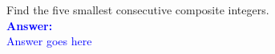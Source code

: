 \item{}
Find the five smallest consecutive composite integers.
\\[12pt]
\ifanswers
\textcolor{blue}{
\textbf{Answer:}\\[6pt]
Answer goes here
}
\newpage
\fi
